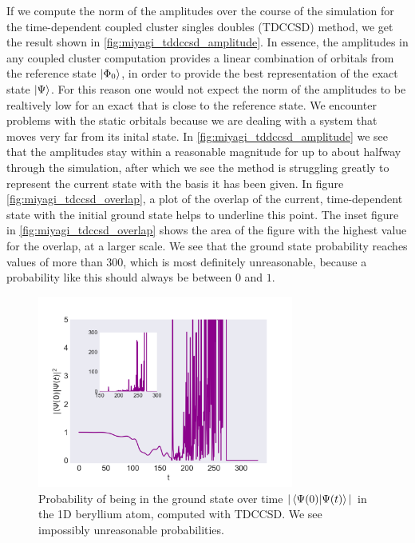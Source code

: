 If we compute the norm of the amplitudes over the course of the simulation for 
the time-dependent coupled cluster singles doubles (TDCCSD) method, we get the 
result shown in \autoref{fig:miyagi_tddccsd_amplitude}. In essence, the amplitudes 
in any coupled cluster computation provides a linear combination of orbitals 
from the reference state $\ket{\Phi_0}$, in order to provide the best representation of the 
exact state $\ket{\Psi}$. For this reason one would not expect the norm of the 
amplitudes to be realtively low for an exact that is close to the reference state.
We encounter problems with the static orbitals because we are dealing with a system that
moves very far 
from its inital state. In \autoref{fig:miyagi_tddccsd_amplitude} we see
that the amplitudes stay within a reasonable magnitude for up to about halfway through 
the simulation, after which we see the method is struggling greatly to 
represent the current state with the basis it has been given. In figure 
\autoref{fig:miyagi_tdccsd_overlap}, a plot of the 
overlap of the current, time-dependent state with the initial ground state
helps to underline this point. The inset figure in \autoref{fig:miyagi_tdccsd_overlap}
shows the area of the figure with the highest value for the overlap, at a larger scale.
We see that the ground state probability reaches values of more than $300$, which is 
most definitely unreasonable, because a probability like this should always be between 
$0$ and $1$.

\begin{figure}
    \centering
    \includegraphics[width=0.75\textwidth]{results/figures/miyagi/overlap_tdccsd.png}
    \caption{Probability of being in the ground state over time 
        $|\braket{\Psi(0)}{\Psi(t)}|$ in the 1D beryllium atom, computed with TDCCSD. 
        We see impossibly unreasonable probabilities.
    }
    \label{fig:miyagi_tdccsd_overlap}
\end{figure}

